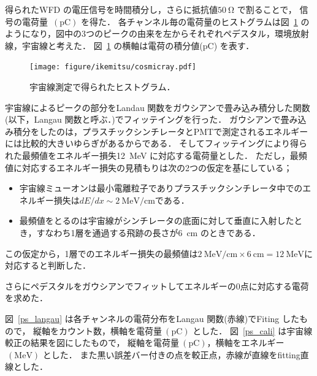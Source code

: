 得られたWFD の電圧信号を時間積分し，さらに抵抗値$50~\mathrm{\Omega}$ で割ることで，
信号の電荷量~$(\mathrm{pC})$ を得た．
各チャンネル毎の電荷量のヒストグラムは図~\ref{cosmicray} のようになり，図中の3つのピークの由来を左からそれぞれペデスタル，環境放射線，宇宙線と考えた．
図~\ref{cosmicray} の横軸は電荷の積分値($\mathrm{pC}$) を表す．
 \begin{figure}[H]
  \centering
  \texttt{[image: figure/ikemitsu/cosmicray.pdf]}
  \caption{宇宙線測定で得られたヒストグラム．}
  \label{cosmicray}
 \end{figure}%

宇宙線によるピークの部分をLandau 関数をガウシアンで畳み込み積分した関数(以下，Langau 関数と呼ぶ．)でフィッテイングを行った．
ガウシアンで畳み込み積分をしたのは，プラスチックシンチレータとPMTで測定されるエネルギーには比較的大きいゆらぎがあるからである．
そしてフィッテイングにより得られた最頻値をエネルギー損失12~MeV に対応する電荷量とした．
ただし，最頻値に対応するエネルギー損失の見積もりは次の2つの仮定を基にしている；
\begin{itemize}
 \item 宇宙線ミューオンは最小電離粒子でありプラスチックシンチレータ中でのエネルギー損失は$dE/dx\sim 2~\mathrm{MeV/cm }$である．
 \item 最頻値をとるのは宇宙線がシンチレータの底面に対して垂直に入射したとき，すなわち1層を通過する飛跡の長さが6~cm のときである．
\end{itemize}
この仮定から，1層でのエネルギー損失の最頻値は$2~\mathrm{MeV/cm}\times6~\mathrm{cm} = 12~\mathrm{MeV }$に対応すると判断した．\cite{leo}

さらにペデスタルをガウシアンでフィットしてエネルギーの0点に対応する電荷を求めた．

図~\ref{ps_langau} は各チャンネルの電荷分布をLangau 関数(赤線)でFiting したもので，
縦軸をカウント数，横軸を電荷量$~(\mathrm{pC})$ とした．
図~\ref{ps_cali} は宇宙線較正の結果を図にしたもので，
縦軸を電荷量$~(\mathrm{pC})$，横軸をエネルギー$~(\mathrm{MeV})$ とした．
また黒い誤差バー付きの点を較正点，赤線が直線をfitting直線とした．

